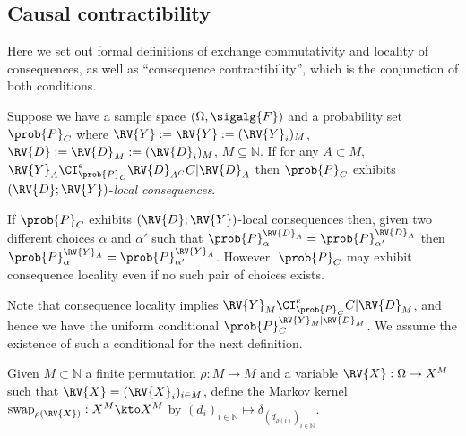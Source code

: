 


\subsection{Causal contractibility}\label{sec:ccontracibility}

Here we set out formal definitions of exchange commutativity and locality of consequences, as well as ``consequence contractibility'', which is the conjunction of both conditions.

\begin{definition}\label{def:caus_cont}
Suppose we have a sample space $(\Omega,\sigalg{F})$ and a probability set $\prob{P}_C$  where $\RV{Y}:=\RV{Y}:=(\RV{Y}_i)_{M}$, $\RV{D}:=\RV{D}_M:=(\RV{D}_i)_M$, $M\subseteq \mathbb{N}$. If for any $A\subset M$, $\RV{Y}_A\CI^e_{\prob{P}_C} \RV{D}_{A^C} C |\RV{D}_A$ then $\prob{P}_C$ exhibits $(\RV{D};\RV{Y})$-\emph{local consequences}.
\end{definition}

If $\prob{P}_C$ exhibits $(\RV{D};\RV{Y})$-local consequences then, given two different choices $\alpha$ and $\alpha'$ such that $\prob{P}_\alpha^{\RV{D}_A}=\prob{P}_{\alpha'}^{\RV{D}_A}$ then $\prob{P}_\alpha^{\RV{Y}_A}=\prob{P}_{\alpha'}^{\RV{Y}_A}$. However, $\prob{P}_C$ may exhibit consequence locality even if no such pair of choices exists.

Note that consequence locality implies $\RV{Y}_M \CI^e_{\prob{P}_C} C |\RV{D}_M$, and hence we have the uniform conditional $\prob{P}_C^{\RV{Y}_M|\RV{D}_M}$. We assume the existence of such a conditional for the next definition.

\begin{definition}
Given $M\subset \mathbb{N}$ a finite permutation $\rho:M\to M$ and a variable $\RV{X}:\Omega\to X^M$ such that $\RV{X}=(\RV{X}_i)_{i\in M}$, define the Markov kernel $\text{swap}_{\rho(\RV{X})}:X^M\kto X^M$ by $(d_i)_{i\in\mathbb{N}}\mapsto \delta_{(d_{\rho(i)})_{i\in\mathbb{N}}}$.
\end{definition}

